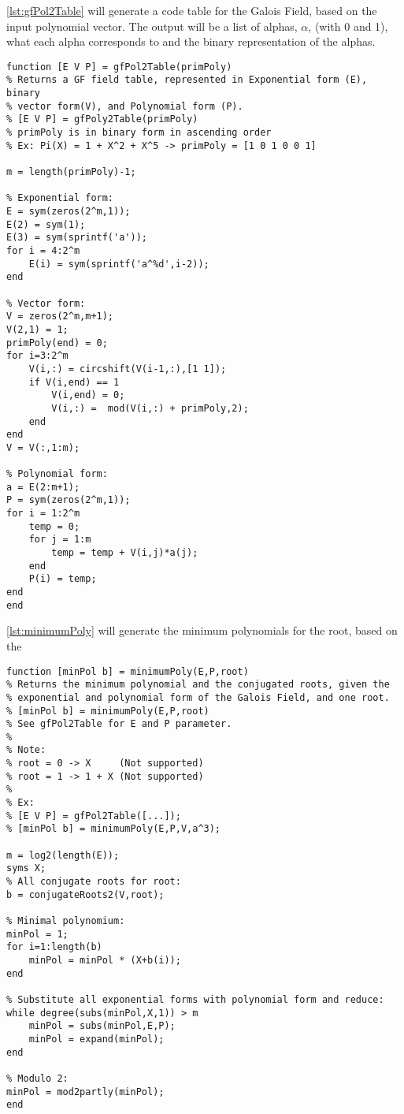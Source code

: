 \documentclass[Main]{subfiles}
\begin{document}
\codeTitle \ref{lst:gfPol2Table} will generate a code table for the Galois Field, based on the input polynomial vector.
The output will be a list of alphas, $\alpha$, (with 0 and 1), what each alpha corresponds to and the binary representation of the alphas.
\begin{lstlisting}[caption=gfPol2Table, style=Code-Matlab, label=lst:gfPol2Table]
function [E V P] = gfPol2Table(primPoly)
% Returns a GF field table, represented in Exponential form (E), binary
% vector form(V), and Polynomial form (P).
% [E V P] = gfPoly2Table(primPoly)
% primPoly is in binary form in ascending order
% Ex: Pi(X) = 1 + X^2 + X^5 -> primPoly = [1 0 1 0 0 1]

m = length(primPoly)-1;

% Exponential form:
E = sym(zeros(2^m,1));
E(2) = sym(1);
E(3) = sym(sprintf('a'));
for i = 4:2^m
    E(i) = sym(sprintf('a^%d',i-2));
end

% Vector form:
V = zeros(2^m,m+1);
V(2,1) = 1;
primPoly(end) = 0;
for i=3:2^m
    V(i,:) = circshift(V(i-1,:),[1 1]);
    if V(i,end) == 1
        V(i,end) = 0;
        V(i,:) =  mod(V(i,:) + primPoly,2);
    end
end
V = V(:,1:m);

% Polynomial form:
a = E(2:m+1);
P = sym(zeros(2^m,1));
for i = 1:2^m
    temp = 0;
    for j = 1:m
        temp = temp + V(i,j)*a(j);
    end
    P(i) = temp;
end
end
\end{lstlisting}



\codeTitle \ref{lst:minimumPoly} will generate the minimum polynomials for the root, based on the 

\begin{lstlisting}[caption=MinimumPoly, style=Code-Matlab, label=lst:minimumPoly]
function [minPol b] = minimumPoly(E,P,root)
% Returns the minimum polynomial and the conjugated roots, given the
% exponential and polynomial form of the Galois Field, and one root.
% [minPol b] = minimumPoly(E,P,root)
% See gfPol2Table for E and P parameter.
%
% Note: 
% root = 0 -> X     (Not supported)
% root = 1 -> 1 + X (Not supported)
%
% Ex: 
% [E V P] = gfPol2Table([...]);
% [minPol b] = minimumPoly(E,P,V,a^3);

m = log2(length(E));
syms X;
% All conjugate roots for root:
b = conjugateRoots2(V,root);

% Minimal polynomium:
minPol = 1;
for i=1:length(b)
    minPol = minPol * (X+b(i));
end
 
% Substitute all exponential forms with polynomial form and reduce:
while degree(subs(minPol,X,1)) > m
    minPol = subs(minPol,E,P);
    minPol = expand(minPol);
end

% Modulo 2:
minPol = mod2partly(minPol);
end
\end{lstlisting}
\end{document}
